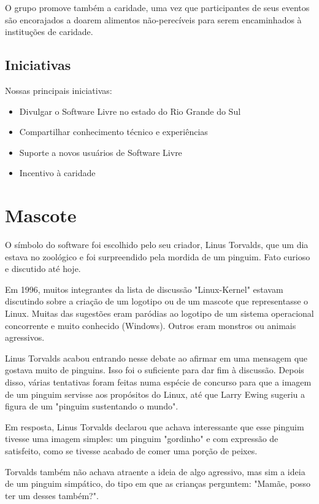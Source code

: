 \documentclass[conference]{IEEEtran}
\begin{document}
		O grupo promove também a caridade, uma vez que participantes de seus eventos são encorajados a doarem alimentos não-perecíveis para serem encaminhados à instituções de caridade.
		
		\subsection{Iniciativas}
		
		Nossas principais iniciativas:
		
		\begin{itemize}
			\item Divulgar o Software Livre no estado do Rio Grande do Sul
			\item Compartilhar conhecimento técnico e experiências
			\item Suporte a novos usuários de Software Livre
			\item Incentivo à caridade
		\end{itemize}
	
	\section{Mascote}
	
	O símbolo do software foi escolhido pelo seu criador, Linus Torvalds, que um dia estava no zoológico e foi surpreendido pela mordida de um pinguim. Fato curioso e discutido até hoje. 
	
	Em 1996, muitos integrantes da lista de discussão "Linux-Kernel" estavam discutindo sobre a criação de um logotipo ou de um mascote que representasse o Linux. Muitas das sugestões eram paródias ao logotipo de um sistema operacional concorrente e muito conhecido (Windows). Outros eram monstros ou animais agressivos. 
	
	Linus Torvalds acabou entrando nesse debate ao afirmar em uma mensagem que gostava muito de pinguins. Isso foi o suficiente para dar fim à discussão. Depois disso, várias tentativas foram feitas numa espécie de concurso para que a imagem de um pinguim servisse aos propósitos do Linux, até que Larry Ewing sugeriu a figura de um "pinguim sustentando o mundo". 
	
	Em resposta, Linus Torvalds declarou que achava interessante que esse pinguim tivesse uma imagem simples: um pinguim "gordinho" e com expressão de satisfeito, como se tivesse acabado de comer uma porção de peixes.
	
	Torvalds também não achava atraente a ideia de algo agressivo, mas sim a ideia de um pinguim simpático, do tipo em que as crianças perguntem: "Mamãe, posso ter um desses também?". 
	
\end{document}
